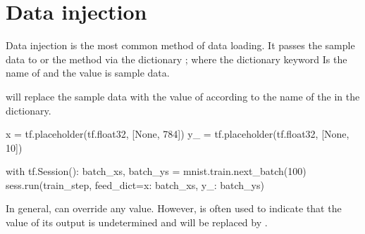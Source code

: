 \section{Data injection}
\begin{content}
Data injection is the most common method of data loading. It passes the sample data to  or the  method via the dictionary ; where the dictionary keyword Is the name of  and the value is sample data.

 will replace the sample data with the value of  according to the name of the  in the dictionary.

\begin{leftbar}
\begin{python}
x = tf.placeholder(tf.float32, [None, 784])
y_ = tf.placeholder(tf.float32, [None, 10])

with tf.Session():
  batch_xs, batch_ys = mnist.train.next_batch(100)
  sess.run(train_step, feed_dict={x: batch_xs, y_: batch_ys})
\end{python}
\end{leftbar}

In general,  can override any  value. However,  is often used to indicate that the value of its output  is undetermined and will be replaced by .

\end{content}


